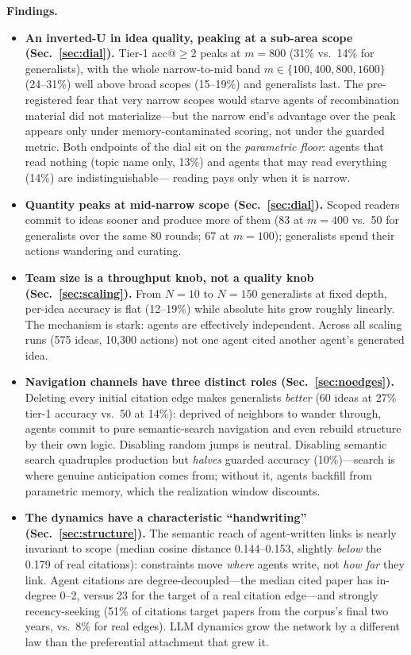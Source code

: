 \documentclass{article} %
\begin{document}
\textbf{Findings.}
\begin{itemize}
\item \textbf{An inverted-U in idea quality, peaking at a sub-area
  scope (Sec.~\ref{sec:dial}).} Tier-1 acc@$\geq$2 peaks at $m{=}800$
  (31\% vs.\ 14\% for generalists), with the whole narrow-to-mid band
  $m \in \{100, 400, 800, 1600\}$ (24--31\%) well above broad scopes
  (15--19\%) and generalists last. The pre-registered fear that very
  narrow scopes would starve agents of recombination material did not
  materialize---but the narrow end's advantage over the peak appears
  only under memory-contaminated scoring, not under the guarded
  metric. Both endpoints of the dial sit on the \emph{parametric
  floor}: agents that read nothing (topic name only, 13\%) and
  agents that may read everything (14\%) are indistinguishable---
  reading pays only when it is narrow.
\item \textbf{Quantity peaks at mid-narrow scope
  (Sec.~\ref{sec:dial}).} Scoped readers commit to ideas sooner and
  produce more of them (83 at $m{=}400$ vs.\ 50 for generalists over
  the same 80 rounds; 67 at $m{=}100$); generalists spend their actions
  wandering and curating.
\item \textbf{Team size is a throughput knob, not a quality knob
  (Sec.~\ref{sec:scaling}).} From $N=10$ to $N=150$ generalists at fixed
  depth, per-idea accuracy is flat (12--19\%) while absolute hits grow
  roughly linearly. The mechanism is stark: agents are effectively independent.
  Across all scaling runs (575 ideas, 10{,}300 actions) not one agent
  cited another agent's generated idea.
\item \textbf{Navigation channels have three distinct roles
  (Sec.~\ref{sec:noedges}).} Deleting every initial citation edge makes
  generalists \emph{better} (60 ideas at 27\% tier-1 accuracy vs.\ 50
  at 14\%): deprived of neighbors to wander through, agents commit to
  pure semantic-search navigation and even rebuild structure by their
  own logic. Disabling random jumps is neutral. Disabling semantic
  search quadruples production but \emph{halves} guarded accuracy
  (10\%)---search is where genuine anticipation comes from; without
  it, agents backfill from parametric memory, which the realization
  window discounts.
\item \textbf{The dynamics have a characteristic ``handwriting''
  (Sec.~\ref{sec:structure}).} The semantic reach of agent-written links
  is nearly invariant to scope (median cosine distance 0.144--0.153,
  slightly \emph{below} the 0.179 of real citations): constraints move
  \emph{where} agents write, not \emph{how far} they link. Agent citations
  are degree-decoupled---the median cited paper has in-degree 0--2, versus
  23 for the target of a real citation edge---and strongly
  recency-seeking (51\% of citations target papers from the corpus's final
  two years, vs.\ 8\% for real edges). LLM dynamics grow the network by a
  different law than the preferential attachment
  \citep{barabasi1999emergence} that grew it.
\end{itemize}
\end{document}
